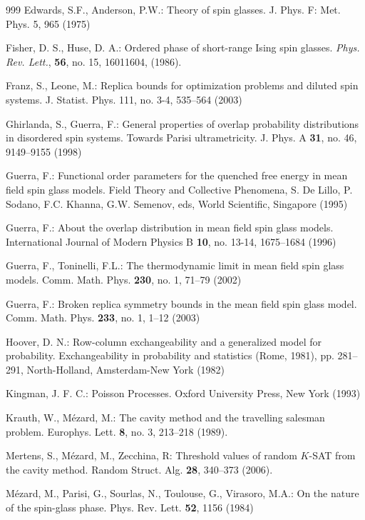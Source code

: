 \documentclass[12pt]{article}
\theoremstyle{nonumberplain}
\begin{document}
\begin{thebibliography}{999}
 Edwards, S.F., Anderson, P.W.: Theory of spin glasses. J. Phys. F: Met. Phys. 5, 965 (1975)

 Fisher, D. S., Huse, D. A.: Ordered phase of short-range Ising spin glasses. \emph{Phys. Rev. Lett.}, \textbf{56}, no. 15, 16011604, (1986).

 Franz, S., Leone, M.: Replica bounds for optimization problems and diluted spin systems. J. Statist. Phys. 111, no. 3-4, 535--564 (2003)

 Ghirlanda, S., Guerra, F.: General properties of overlap probability distributions in disordered spin systems. Towards Parisi ultrametricity.  J. Phys. A  \textbf{31}, no. 46, 9149--9155 (1998) 

 Guerra, F.: Functional order parameters for the quenched free energy in mean field spin glass models. Field Theory and Collective Phenomena, S. De Lillo, P. Sodano, F.C. Khanna, G.W. Semenov, eds, World Scientific, Singapore (1995)

 Guerra, F.: About the overlap distribution in mean field spin glass models.
International Journal of Modern Physics B \textbf{10}, no. 13-14, 1675--1684 (1996)

 Guerra, F., Toninelli, F.L.: The thermodynamic limit in mean field spin glass models. Comm. Math. Phys. \textbf{230}, no. 1, 71--79 (2002)

 Guerra, F.: Broken replica symmetry bounds in the mean field spin glass model. Comm. Math. Phys. {\bf 233}, no. 1, 1--12 (2003)

 Hoover, D. N.: Row-column exchangeability and a generalized model for probability. Exchangeability in probability and statistics (Rome, 1981), pp. 281--291, North-Holland, Amsterdam-New York (1982) 

 Kingman, J. F. C.:  Poisson Processes. Oxford University Press, New York (1993)

 Krauth, W., M\'ezard, M.: The cavity method and the travelling salesman problem. Europhys. Lett. \textbf{8}, no. 3, 213--218 (1989).

 Mertens, S., M\'ezard, M., Zecchina, R: Threshold values of random $K$-SAT from the cavity method. Random Struct. Alg. \textbf{28}, 340--373 (2006).

 M\'ezard, M., Parisi, G., Sourlas, N., Toulouse, G., Virasoro, M.A.: On the nature of the spin-glass phase. Phys. Rev. Lett. \textbf{52}, 1156 (1984) 


\end{thebibliography}
\end{document}
